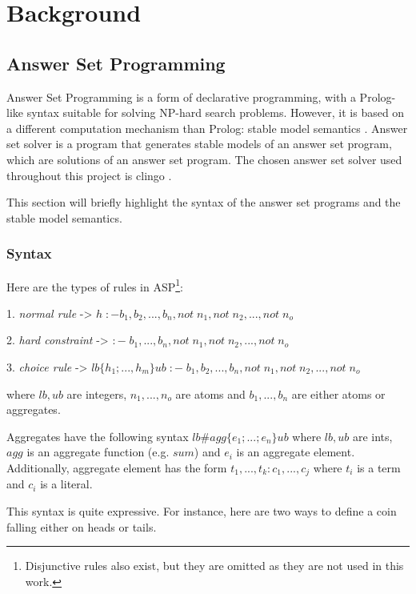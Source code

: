 \chapter{Background}

\section{Answer Set Programming}

Answer Set Programming  \cite{RefWorks:RefID:1-lifschitz2008answer} is a form of declarative programming, with a Prolog-like syntax suitable for solving NP-hard search problems.
However, it is based on a different computation mechanism than Prolog: stable model semantics \cite{RefWorks:RefID:21-fitting1992michael}.
Answer set solver is a program that generates stable models of an answer set program, which are solutions of an answer set program. 
The chosen answer set solver used throughout this project is clingo \cite{RefWorks:RefID:22-clingo}.

This section will briefly highlight the syntax of the answer set programs and the stable model semantics.

\subsection{Syntax}

Here are the types of rules in ASP\footnote{Disjunctive rules also exist, but they are omitted as they are not used in this work.}: 

 1. \emph{normal rule} -> $ h\; :- b_1, b_2, ..., b_n, not\; n_1, not\; n_2, ..., not\; n_o$
 
 2. \emph{hard constraint} -> $:- \; b_1, ..., b_n, not\; n_1, not\; n_2, ..., not\; n_o$
 
 3. \emph{choice rule} -> $lb\{h_1; ..., h_m\}ub\; :- \;  b_1, b_2, ..., b_n, not\; n_1, not\; n_2, ..., not\; n_o$
 
where $lb, ub$ are integers, $n_1,...,n_o$ are atoms and $b_1, ...,b_n$ are either atoms or aggregates.

Aggregates have the following syntax $lb\#agg\{e_1; ...; e_n\}ub$ where $lb, ub$ are ints, $agg$ is an aggregate function (e.g. $sum$) and $e_i$ is an aggregate element.
Additionally, aggregate element has the form  $t_1, ..., t_k : c_1, ..., c_j$ where $t_i$ is a term and $c_i$ is a literal.
 
This syntax is quite expressive. For instance, here are two ways to define a coin falling either on heads or tails.

